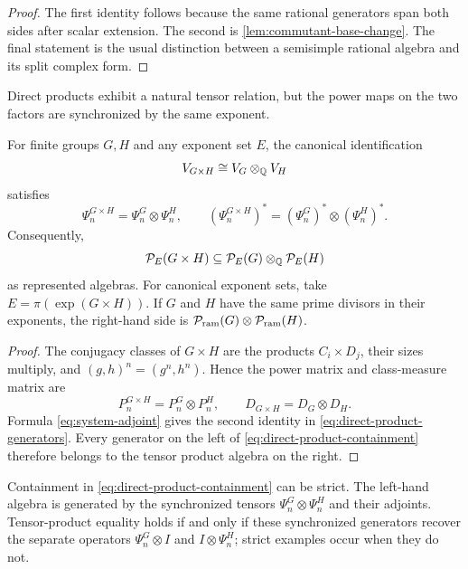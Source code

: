\begin{proof}
The first identity follows because the same rational generators span both
sides after scalar extension.  The second is
\cref{lem:commutant-base-change}.  The final statement is the usual
distinction between a semisimple rational algebra and its split complex
form.
\end{proof}

Direct products exhibit a natural tensor relation, but the power
maps on the two factors are synchronized by the same exponent.

\begin{proposition}
\label{prop:direct-product-containment}
For finite groups \(G,H\) and any exponent set \(E\), the canonical
identification
\[
 V_{G\times H}\cong V_G\otimes_\mathbb Q V_H
\]
satisfies
\begin{equation}
 \Psi_n^{G\times H}=\Psi_n^G\otimes\Psi_n^H,
 \qquad
 (\Psi_n^{G\times H})^*=(\Psi_n^G)^*\otimes(\Psi_n^H)^*.
 \label{eq:direct-product-generators}
\end{equation}
Consequently,
\begin{equation}
 \mathcal P_E(G\times H)
 \subseteq
 \mathcal P_E(G)\otimes_\mathbb Q
 \mathcal P_E(H)
 \label{eq:direct-product-containment}
\end{equation}
as represented algebras.  For canonical exponent sets, take
\(E=\pi(\exp(G\times H))\).  If \(G\) and \(H\) have the same prime
divisors in their exponents, the right-hand side is
\(\mathcal P_{\mathrm{ram}}(G)\otimes
\mathcal P_{\mathrm{ram}}(H)\).
\end{proposition}

\begin{proof}
The conjugacy classes of \(G\times H\) are the products \(C_i\times D_j\),
their sizes multiply, and
\((g,h)^n=(g^n,h^n)\).  Hence the power matrix and class-measure matrix are
\[
 P_n^{G\times H}=P_n^G\otimes P_n^H,
 \qquad
 D_{G\times H}=D_G\otimes D_H.
\]
Formula \eqref{eq:system-adjoint} gives the second identity in
\eqref{eq:direct-product-generators}.  Every generator on the left of
\eqref{eq:direct-product-containment} therefore belongs to the tensor
product algebra on the right.
\end{proof}

Containment in \eqref{eq:direct-product-containment} can be strict.  The
left-hand algebra is generated by the synchronized tensors
\(\Psi_n^G\otimes\Psi_n^H\) and their adjoints.  Tensor-product equality
holds if and only if these synchronized generators recover the separate
operators \(\Psi_n^G\otimes I\) and \(I\otimes\Psi_n^H\); strict examples
occur when they do not.

